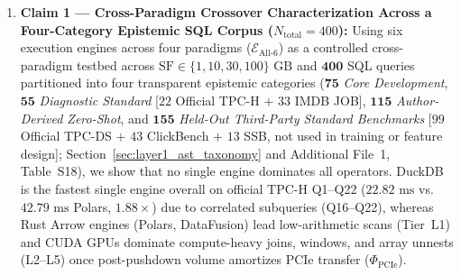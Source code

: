\documentclass[10pt,a4paper]{article}
\begin{document}
\begin{enumerate}[leftmargin=1.5em,itemsep=3pt]
    \item \textbf{Claim 1 --- Cross-Paradigm Crossover Characterization Across a Four-Category Epistemic SQL Corpus ($N_{\text{total}}=400$):} Using six execution engines across four paradigms ($\mathcal{E}_{\text{All-6}}$) as a controlled cross-paradigm testbed across $\text{SF}\in\{1,10,30,100\}\text{ GB}$ and $\mathbf{400}$ SQL queries partitioned into four transparent epistemic categories ($\mathbf{75}$ \emph{Core Development}, $\mathbf{55}$ \emph{Diagnostic Standard} [$22$ Official TPC-H $+$ $33$ IMDB JOB], $\mathbf{115}$ \emph{Author-Derived Zero-Shot}, and $\mathbf{155}$ \emph{Held-Out Third-Party Standard Benchmarks} [$99$ Official TPC-DS $+$ $43$ ClickBench $+$ $13$ SSB, not used in training or feature design]; Section~\ref{sec:layer1_ast_taxonomy} and Additional File~1, Table~S18), we show that no single engine dominates all operators. DuckDB is the fastest single engine overall on official TPC-H Q1--Q22 ($22.82\text{ ms}$ vs.\ $42.79\text{ ms}$ Polars, $1.88\times$) due to correlated subqueries (Q16--Q22), whereas Rust Arrow engines (Polars, DataFusion) lead low-arithmetic scans (Tier~L1) and CUDA GPUs dominate compute-heavy joins, windows, and array unnests (L2--L5) once post-pushdown volume amortizes PCIe transfer ($\Phi_{\text{PCIe}}$).

\end{enumerate}
\end{document}
